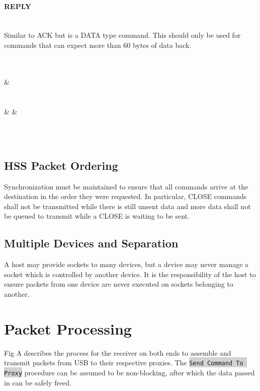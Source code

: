 \documentclass[10pt]{article}
\begin{document}
	\paragraph{REPLY} \mbox{}\\
	Similar to ACK but is a DATA type command. This should only be used for commands that can expect more than 60 bytes of data back. \\
	\\
	\begin{bytefield}[bitwidth=1.7em]{32}
		 \\
		 &
		 \\
		 \\
		 \\
		 &
		 &
		 \\
		 \\
	\end{bytefield}\\

	\subsection{HSS Packet Ordering}
	Synchronization must be maintained to ensure that all commands arrive at the destination in the order they were requested. In particular, CLOSE commands shall not be transmitted while there is still unsent data and more data shall not be queued to transmit while a CLOSE is waiting to be sent. 
	
	\subsection{Multiple Devices and Separation}
	A host may provide sockets to many devices, but a device may never manage a socket which is controlled by another device. It is the responsibility of the host to ensure packets from one device are never executed on sockets belonging to another.
	
	\section{Packet Processing}
	Fig A describes the process for the receiver on both ends to assemble and transmit packets from USB to their respective proxies. The \colorbox{lightgray}{\lstinline{Send Command To Proxy}} procedure can be assumed to be non-blocking, after which the data passed in can be safely freed. \\
	\\	
\end{document}
